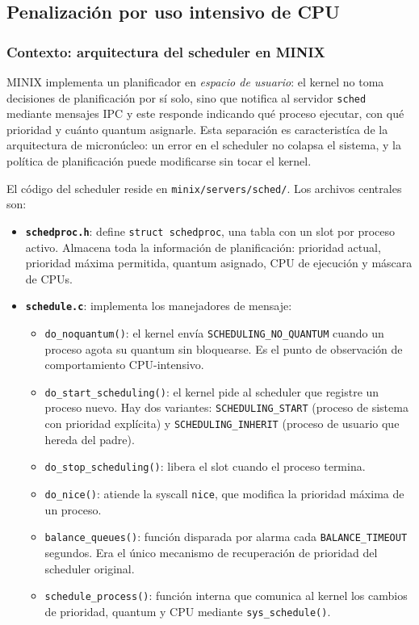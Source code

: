 \documentclass[11pt,a4paper]{article}
\begin{document}
\subsection{Penalizaci\'on por uso intensivo de CPU}

\subsubsection*{Contexto: arquitectura del scheduler en MINIX}

MINIX implementa un planificador en \emph{espacio de usuario}: el kernel no toma decisiones de planificaci\'on por s\'i solo, sino que notifica al servidor \texttt{sched} mediante mensajes IPC y este responde indicando qu\'e proceso ejecutar, con qu\'e prioridad y cu\'anto quantum asignarle. Esta separaci\'on es caracterist\'ica de la arquitectura de micron\'ucleo: un error en el scheduler no colapsa el sistema, y la pol\'itica de planificaci\'on puede modificarse sin tocar el kernel.

El c\'odigo del scheduler reside en \texttt{minix/servers/sched/}. Los archivos centrales son:

\begin{itemize}[leftmargin=*]
  \item \textbf{\texttt{schedproc.h}}: define \texttt{struct schedproc}, una tabla con un slot por proceso activo. Almacena toda la informaci\'on de planificaci\'on: prioridad actual, prioridad m\'axima permitida, quantum asignado, CPU de ejecuci\'on y m\'ascara de CPUs.
  \item \textbf{\texttt{schedule.c}}: implementa los manejadores de mensaje:
    \begin{itemize}
      \item \texttt{do\_noquantum()}: el kernel env\'ia \texttt{SCHEDULING\_NO\_QUANTUM} cuando un proceso agota su quantum sin bloquearse. Es el punto de observaci\'on de comportamiento CPU-intensivo.
      \item \texttt{do\_start\_scheduling()}: el kernel pide al scheduler que registre un proceso nuevo. Hay dos variantes: \texttt{SCHEDULING\_START} (proceso de sistema con prioridad expl\'icita) y \texttt{SCHEDULING\_INHERIT} (proceso de usuario que hereda del padre).
      \item \texttt{do\_stop\_scheduling()}: libera el slot cuando el proceso termina.
      \item \texttt{do\_nice()}: atiende la syscall \texttt{nice}, que modifica la prioridad m\'axima de un proceso.
      \item \texttt{balance\_queues()}: funci\'on disparada por alarma cada \texttt{BALANCE\_TIMEOUT} segundos. Era el \'unico mecanismo de recuperaci\'on de prioridad del scheduler original.
      \item \texttt{schedule\_process()}: funci\'on interna que comunica al kernel los cambios de prioridad, quantum y CPU mediante \texttt{sys\_schedule()}.
    \end{itemize}
\end{itemize}
\end{document}
